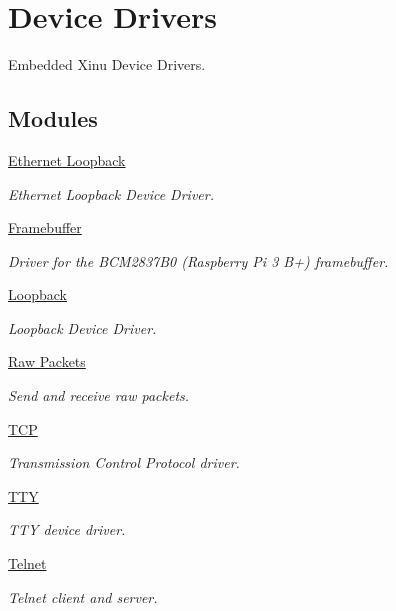\hypertarget{group__devices}{\section{Device Drivers}
\label{group__devices}
}


Embedded Xinu Device Drivers.  


\subsection*{Modules}
\begin{DoxyCompactItemize}
\item 
\hyperlink{group__ethloop}{Ethernet Loopback}
\begin{DoxyCompactList}\small\item\em Ethernet Loopback Device Driver. \end{DoxyCompactList}\item 
\hyperlink{group__framebuffer}{Framebuffer}
\begin{DoxyCompactList}\small\item\em Driver for the B\-C\-M2837\-B0 (Raspberry Pi 3 B+) framebuffer. \end{DoxyCompactList}\item 
\hyperlink{group__loopback}{Loopback}
\begin{DoxyCompactList}\small\item\em Loopback Device Driver. \end{DoxyCompactList}\item 
\hyperlink{group__raw}{Raw Packets}
\begin{DoxyCompactList}\small\item\em Send and receive raw packets. \end{DoxyCompactList}\item 
\hyperlink{group__tcp}{T\-C\-P}
\begin{DoxyCompactList}\small\item\em Transmission Control Protocol driver. \end{DoxyCompactList}\item 
\hyperlink{group__tty}{T\-T\-Y}
\begin{DoxyCompactList}\small\item\em T\-T\-Y device driver. \end{DoxyCompactList}\item 
\hyperlink{group__telnet}{Telnet}
\begin{DoxyCompactList}\small\item\em Telnet client and server. \end{DoxyCompactList}\item 

\end{DoxyCompactItemize}
